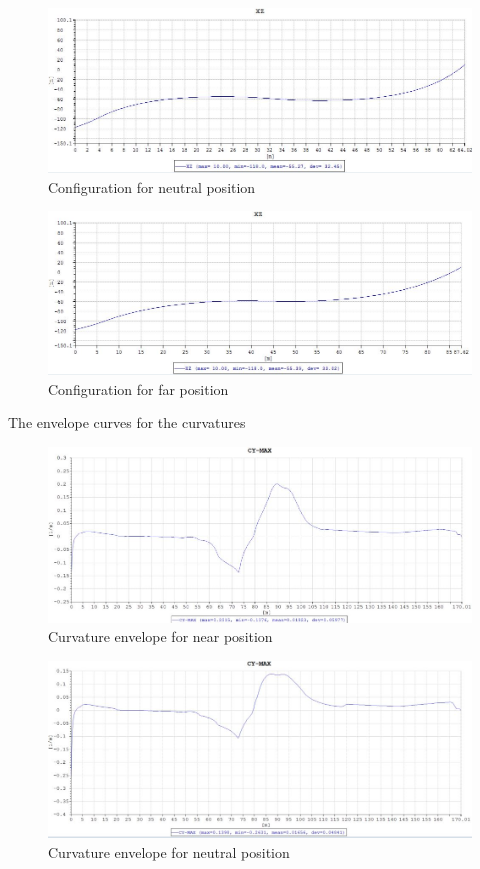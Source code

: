 \begin{figure}[H]
\centering
\includegraphics[scale=0.5]{figures/configneu}
\caption{Configuration for neutral position}
 \label{fig:configneu}
\end{figure}

\begin{figure}[H]
\centering
\includegraphics[scale=0.5]{figures/configfar}
\caption{Configuration for far position}
 \label{fig:configfar}
\end{figure}

\noindent The envelope curves for the curvatures

\begin{figure}[H]
\centering
\includegraphics[scale=0.8]{figures/envcurvenear}
\caption{Curvature envelope for near position}
 \label{fig:envcurvenear}
\end{figure}

\begin{figure}[H]
\centering
\includegraphics[scale=0.8]{figures/envcurveneu}
\caption{Curvature envelope for neutral position}
 \label{fig:envcurveneu}
\end{figure}

